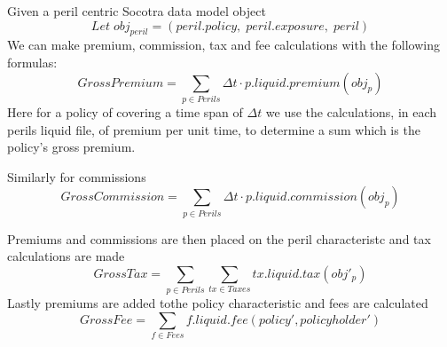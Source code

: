 \documentclass[a4paper,11pt]{article}
\begin{document}
Given a peril centric Socotra data model object
\begin{equation*}
Let \; obj_{peril} = (peril.policy, \; peril.exposure, \; peril)
\end{equation*}
We can make premium, commission, tax and fee calculations with the following formulas:
\begin{equation*}
GrossPremium = \sum_{p \in Perils} \Delta t \cdot p.liquid.premium(obj_p) 
\end{equation*}
Here for a policy of covering a time span of $\Delta t$ we use the calculations, in each perils liquid file,
of premium per unit time, to determine a sum which is the policy's gross premium.

Similarly for commissions
\begin{equation*}
GrossCommission = \sum_{p \in Perils} \Delta t \cdot p.liquid.commission(obj_p)
\end{equation*}

Premiums and commissions are then placed on the peril characteristc and tax calculations are made
\begin{equation*}
  GrossTax = \sum_{p \in Perils} \sum_{tx \in Taxes} tx.liquid.tax(obj'_p) 
\end{equation*}
Lastly premiums are added tothe policy characteristic and fees are calculated
\begin{equation*}
GrossFee = \sum_{f \in Fees} f.liquid.fee(policy', policyholder')
\end{equation*}
\end{document}
